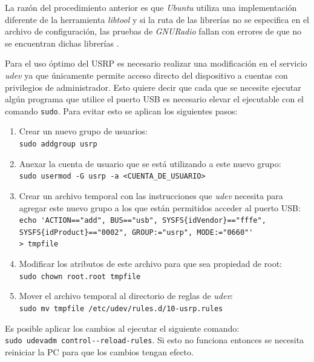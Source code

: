 La raz\'on del procedimiento anterior es que \emph{Ubuntu} utiliza una
implementaci\'on diferente de la herramienta \emph{libtool} y si la ruta de las
librer\'ias no se especifica en el archivo de configuraci\'on, las pruebas
de \emph{GNURadio} fallan con errores de que no se encuentran dichas
librer\'ias \cite{radio}.


Para el uso \'optimo del USRP es necesario realizar una modificaci\'on en el
servicio \emph{udev} ya que \'unicamente permite acceso directo del dispositivo
a cuentas con privilegios de administrador. Esto quiere decir que cada que
se necesite ejecutar alg\'un programa que utilice el puerto USB es necesario
elevar el ejecutable con el comando \verb|sudo|. Para evitar esto se aplican los siguientes pasos:

\begin{enumerate}
  \item Crear un nuevo grupo de usuarios:\\
  \verb|sudo addgroup usrp|
  \item Anexar la cuenta de usuario que se est\'a utilizando a este nuevo
  grupo:\\
  \verb|sudo usermod -G usrp -a <CUENTA_DE_USUARIO>|
  \item Crear un archivo temporal con las instrucciones que \emph{udev} necesita
  para agregar este nuevo grupo a los que est\'an permitidos acceder al puerto
  USB:\\
  \verb|echo 'ACTION=="add", BUS=="usb", SYSFS{idVendor}=="fffe",|\\
  \verb|SYSFS{idProduct}=="0002", GROUP:="usrp", MODE:="0660"'|\\
  \verb|> tmpfile|
  \item Modificar los atributos de este archivo para que sea propiedad de root:\\
  \verb|sudo chown root.root tmpfile|
  \item Mover el archivo temporal al directorio de reglas de \emph{udev}:\\
  \verb|sudo mv tmpfile /etc/udev/rules.d/10-usrp.rules|
\end{enumerate}

Es posible aplicar los cambios al ejecutar el siguiente comando:\\
\verb|sudo udevadm control--reload-rules|. Si esto no funciona entonces se necesita reiniciar la PC
para que los cambios tengan efecto.


